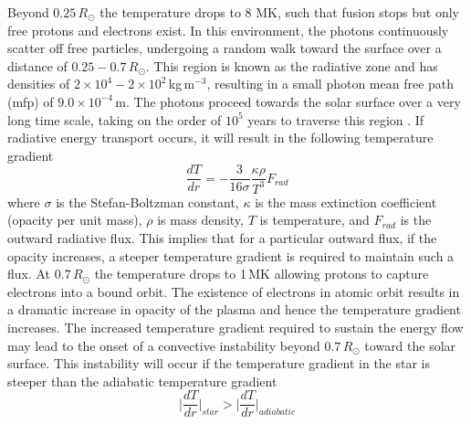 Beyond $0.25\,R_{\odot}$ the temperature drops to 8 MK, such that fusion stops but only free protons and electrons exist. In this environment, the photons continuously scatter off free particles, undergoing a random walk toward the surface over a distance of $0.25-0.7\,R_{\odot}$. This region is known as the radiative zone and has densities of $2\times10^4-2\times10^2$\,kg\,m$^{-3}$, resulting in a small photon mean free path (mfp) of $9.0\times10^{-4}$\,m. The photons proceed towards the solar surface over a very long time scale, taking on the order of $10^{5}$ years to traverse this region \citep{mitalas1992}. If radiative energy transport occurs, it will result in the following temperature gradient
\begin{equation}
\frac{dT}{dr} = -\frac{3}{16 \sigma}\frac{\kappa \rho}{T^3}F_{rad}
\end{equation}
where $\sigma$ is the Stefan-Boltzman constant, $\kappa$ is the mass extinction coefficient (opacity per unit mass), $\rho$ is mass density, $T$ is temperature, and $F_{rad}$ is the outward radiative flux. This implies that for a particular outward flux, if the opacity increases, a steeper temperature gradient is required to maintain such a flux. At $0.7\,R_{\odot}$ the temperature drops to 1\,MK allowing protons to capture electrons into a bound orbit. The existence of electrons in atomic orbit results in a dramatic increase in opacity of the plasma \citep{turk2011} and hence the temperature gradient increases. The increased temperature gradient required to sustain the energy flow may lead to the onset of a convective instability beyond $0.7\,R_{\odot}$ toward the solar surface. This instability will occur if the temperature gradient in the star is steeper than the adiabatic temperature gradient
\begin{equation}
\Bigg|\frac{dT}{dr}\Bigg|_{star} > \Bigg|\frac{dT}{dr}\Bigg|_{adiabatic}
\end{equation}
